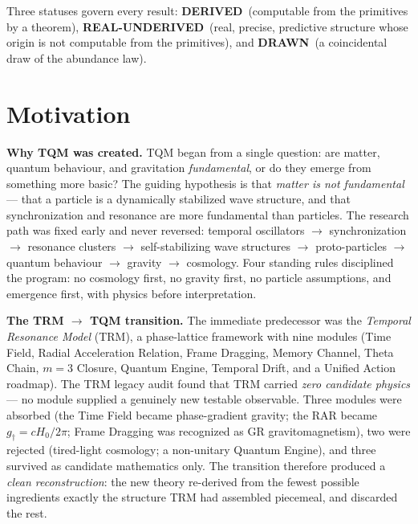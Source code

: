 \documentclass[10pt,a4paper]{article}
\newcommand{\derived}{\textbf{DERIVED}}
\newcommand{\realunder}{\textbf{REAL-UNDERIVED}}
\newcommand{\drawn}{\textbf{DRAWN}}
\begin{document}
Three statuses govern every result: \derived\ (computable from the primitives by a
theorem), \realunder\ (real, precise, predictive structure whose origin is not computable
from the primitives), and \drawn\ (a coincidental draw of the abundance law).

\section{Motivation}

\textbf{Why TQM was created.} TQM began from a single question: are matter, quantum
behaviour, and gravitation \emph{fundamental}, or do they emerge from something more
basic? The guiding hypothesis is that \emph{matter is not fundamental} --- that a particle
is a dynamically stabilized wave structure, and that synchronization and resonance are
more fundamental than particles. The research path was fixed early and never reversed:
temporal oscillators $\to$ synchronization $\to$ resonance clusters $\to$
self-stabilizing wave structures $\to$ proto-particles $\to$ quantum behaviour $\to$
gravity $\to$ cosmology. Four standing rules disciplined the program: no cosmology first,
no gravity first, no particle assumptions, and emergence first, with physics before
interpretation.

\textbf{The TRM $\to$ TQM transition.} The immediate predecessor was the \emph{Temporal
Resonance Model} (TRM), a phase-lattice framework with nine modules (Time Field, Radial
Acceleration Relation, Frame Dragging, Memory Channel, Theta Chain, $m=3$ Closure, Quantum
Engine, Temporal Drift, and a Unified Action roadmap). The TRM legacy audit found that TRM
carried \emph{zero candidate physics} --- no module supplied a genuinely new testable
observable. Three modules were absorbed (the Time Field became phase-gradient gravity; the
RAR became $g_\dagger=cH_0/2\pi$; Frame Dragging was recognized as GR gravitomagnetism),
two were rejected (tired-light cosmology; a non-unitary Quantum Engine), and three survived
as candidate mathematics only. The transition therefore produced a \emph{clean
reconstruction}: the new theory re-derived from the fewest possible ingredients exactly the
structure TRM had assembled piecemeal, and discarded the rest.
\end{document}
